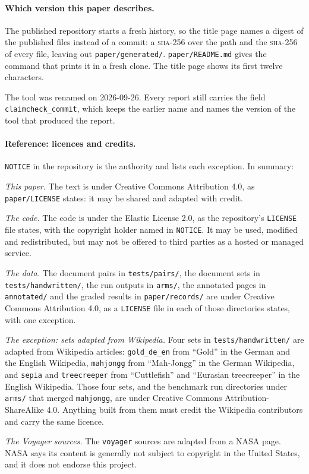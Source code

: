 \paragraph{Which version this paper describes.} The published repository starts a fresh history, so the title page names a digest of the published files instead of a commit: a \textsc{sha}-256 over the path and the \textsc{sha}-256 of every file, leaving out \texttt{paper/generated/}. \texttt{paper/README.md} gives the command that prints it in a fresh clone. The title page shows its first twelve characters.

The tool was renamed on 2026-09-26. Every report still carries the field \texttt{claimcheck\_commit}, which keeps the earlier name and names the version of the tool that produced the report.

\paragraph{Reference: licences and credits.} \texttt{NOTICE} in the repository is the authority and lists each exception. In summary:
\begin{points}
\item \emph{This paper.} The text is under Creative Commons Attribution 4.0, as \texttt{paper/LICENSE} states: it may be shared and adapted with credit.
\item \emph{The code.} The code is under the Elastic License 2.0, as the repository's \texttt{LICENSE} file states, with the copyright holder named in \texttt{NOTICE}. It may be used, modified and redistributed, but may not be offered to third parties as a hosted or managed service.
\item \emph{The data.} The document pairs in \texttt{tests/pairs/}, the document sets in \texttt{tests/handwritten/}, the run outputs in \texttt{arms/}, the annotated pages in \texttt{annotated/} and the graded results in \texttt{paper/records/} are under Creative Commons Attribution 4.0, as a \texttt{LICENSE} file in each of those directories states, with one exception.
\item \emph{The exception: sets adapted from Wikipedia.} Four sets in \texttt{tests/handwritten/} are adapted from Wikipedia articles: \texttt{gold\_de\_en} from ``Gold'' in the German and the English Wikipedia, \texttt{mahjongg} from ``Mah-Jongg'' in the German Wikipedia, and \texttt{sepia} and \texttt{treecreeper} from ``Cuttlefish'' and ``Eurasian treecreeper'' in the English Wikipedia. Those four sets, and the benchmark run directories under \texttt{arms/} that merged \texttt{mahjongg}, are under Creative Commons Attribution-ShareAlike 4.0. Anything built from them must credit the Wikipedia contributors and carry the same licence.
\item \emph{The Voyager sources.} The \texttt{voyager} sources are adapted from a NASA page. NASA says its content is generally not subject to copyright in the United States, and it does not endorse this project.
\end{points}
